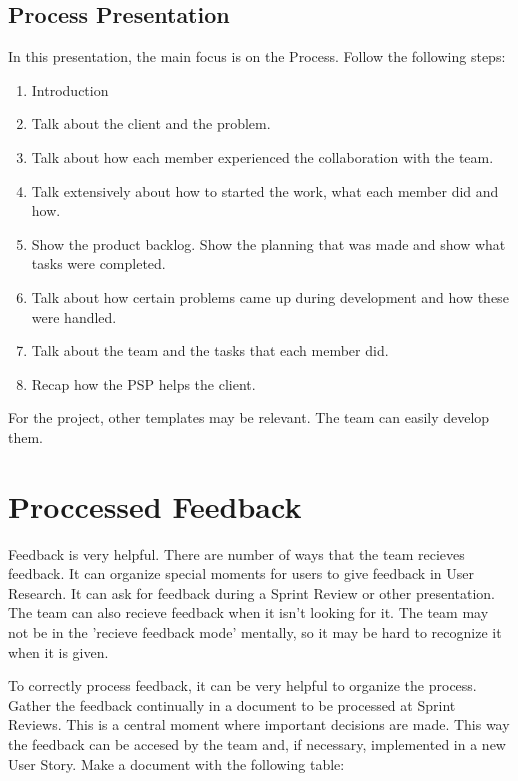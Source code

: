 \documentclass[10pt]{report}
\begin{document}
\subsection{Process Presentation}

In this presentation, the main focus is on the Process. Follow the following steps:

\begin{enumerate}
	\item Introduction
	\item Talk about the client and the problem.
	\item Talk about how each member experienced the collaboration with the team.
	\item Talk extensively about how to started the work, what each member did and how.
	\item Show the product backlog. Show the planning that was made and show what tasks were completed.
	\item Talk about how certain problems came up during development and how these were handled.
	\item Talk about the team and the tasks that each member did.
	\item Recap how the PSP helps the client.
\end{enumerate}

For the project, other templates may be relevant. The team can easily develop them.

\newpage

\section{Proccessed Feedback}

Feedback is very helpful. There are number of ways that the team recieves feedback. It can organize special moments for users to give feedback in User Research. It can ask for feedback during a Sprint Review or other presentation. The team can also recieve feedback when it isn't looking for it. The team may not be in the 'recieve feedback mode' mentally, so it may be hard to recognize it when it is given.

\medskip

To correctly process feedback, it can be very helpful to organize the process. Gather the feedback continually in a document to be processed at Sprint Reviews. This is a central moment where important decisions are made. This way the feedback can be accesed by the team and, if necessary, implemented in a new User Story. Make a document with the following table:
\end{document}
